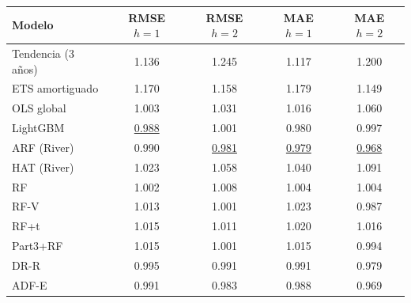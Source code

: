 \begin{tabularx}{\textwidth}{X *{4}{c}}
\toprule
Modelo & RMSE $h=1$ & RMSE $h=2$ & MAE $h=1$ & MAE $h=2$ \\
\midrule
Tendencia (3 años) & 1.136 & 1.245 & 1.117 & 1.200 \\
ETS amortiguado & 1.170 & 1.158 & 1.179 & 1.149 \\
OLS global & 1.003 & 1.031 & 1.016 & 1.060 \\
LightGBM & \underline{0.988} & 1.001 & 0.980 & 0.997 \\
ARF (River) & 0.990 & \underline{0.981} & \underline{0.979} & \underline{0.968} \\
HAT (River) & 1.023 & 1.058 & 1.040 & 1.091 \\
RF & 1.002 & 1.008 & 1.004 & 1.004 \\
RF-V & 1.013 & 1.001 & 1.023 & 0.987 \\
RF+t & 1.015 & 1.011 & 1.020 & 1.016 \\
Part3+RF & 1.015 & 1.001 & 1.015 & 0.994 \\
DR-R & 0.995 & 0.991 & 0.991 & 0.979 \\
ADF-E & 0.991 & 0.983 & 0.988 & 0.969 \\
\bottomrule
\end{tabularx}

